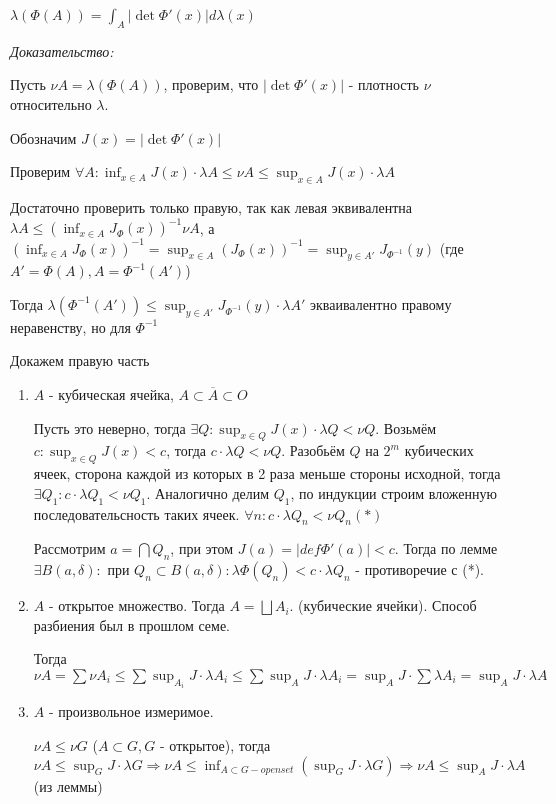 \documentclass[paper=a4, fontsize=17pt]{article}
\begin{document}
$\lambda(\Phi(A)) = \int_A |\det \Phi' (x)| d \lambda(x)$

\emph{Доказательство:}

Пусть $\nu A = \lambda(\Phi(A))$, проверим, что $|\det \Phi' (x)|$ - плотность $\nu$ относительно $\lambda$.

Обозначим $J(x) = |\det \Phi' (x)|$

Проверим $\forall A: \inf_{x \in A} J(x) \cdot \lambda A \leqslant \nu A \leqslant \sup_{x \in A} J(x) \cdot \lambda A$

Достаточно проверить только правую, так как левая эквивалентна $\lambda A \leqslant (\inf_{x \in A} J_{\Phi}(x))^{-1} \nu A$, а $(\inf_{x \in A} J_{\Phi}(x))^{-1} = \sup_{x \in A} (J_{\Phi}(x))^{-1} = \sup_{y \in A'} J_{\Phi^{-1}}(y)$ (где $A' = \Phi(A), A = \Phi^{-1}(A')$)

Тогда $\lambda(\Phi^{-1}(A')) \leqslant \sup_{y \in A'} J_{\Phi^{-1}}(y) \cdot \lambda A'$ экваивалентно правому неравенству, но для $\Phi^{-1}$

Докажем правую часть

\begin{enumerate}
	\item $A$ - кубическая ячейка, $A \subset \overline{A} \subset O$
	
	Пусть это неверно, тогда $\exists Q: \sup_{x \in Q} J(x) \cdot \lambda Q < \nu Q$. Возьмём $c:  \sup_{x \in Q} J(x) < c$, тогда $c \cdot \lambda Q < \nu Q$. Разобьём $Q$ на $2^m$ кубических ячеек, сторона каждой из которых в 2 раза меньше стороны исходной, тогда $\exists Q_1: c \cdot \lambda Q_1 < \nu Q_1$. Аналогично делим $Q_1$, по индукции строим вложенную последовательсность таких ячеек. $\forall n: c \cdot \lambda Q_n < \nu Q_n (*)$
	
	Рассмотрим $a = \bigcap Q_n$, при этом $J(a) = |def \Phi'(a)| < c$. Тогда по лемме $\exists B(a, \delta):$ при $Q_n \subset B(a, \delta): \lambda \Phi(Q_n) < c \cdot \lambda Q_n$ - противоречие с (*).
	
	\item $A$ - открытое множество. Тогда $A = \bigsqcup A_i$. (кубические ячейки). Способ разбиения был в прошлом семе.
	
	Тогда $\nu A = \sum \nu A_i \leqslant \sum \sup_{A_i} J \cdot  \lambda A_i \leqslant \sum \sup_{A} J \cdot \lambda A_i = \sup_{A} J \cdot \sum \lambda A_i = \sup_{A} J \cdot  \lambda A$ 
	
	\item $A$ - произвольное измеримое.
	
	$\nu A \leqslant \nu G$ ($A \subset G, G$ - открытое), тогда $\nu A \leqslant \sup_G J \cdot \lambda G \Rightarrow \nu A \leqslant \inf_{A \subset G - open set}(\sup_G J \cdot \lambda G) \Rightarrow \nu A \leqslant \sup_A J \cdot \lambda A$ (из леммы)
	
\end{enumerate}
\end{document}
